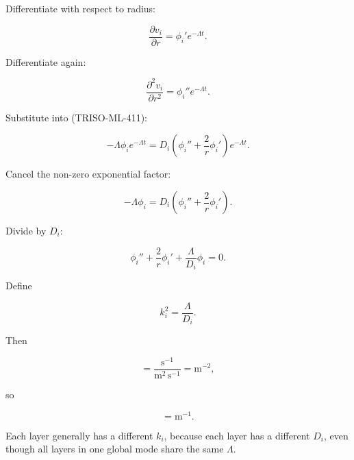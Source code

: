 \documentclass[11pt,a4paper]{article}
\begin{document}
Differentiate with respect to radius:

\begin{equation}
\frac{\partial v_i}{\partial r}
=
\phi_i'e^{-\Lambda t}.
\tag{TRISO-ML-422}
\label{eq:triso-ml-422}
\end{equation}

Differentiate again:

\begin{equation}
\frac{\partial^2v_i}{\partial r^2}
=
\phi_i''e^{-\Lambda t}.
\tag{TRISO-ML-423}
\label{eq:triso-ml-423}
\end{equation}

Substitute into (TRISO-ML-411):

\begin{equation}
-\Lambda\phi_i e^{-\Lambda t}
=
D_i
\left(
\phi_i''
+\frac2r\phi_i'
\right)
e^{-\Lambda t}.
\tag{TRISO-ML-424}
\label{eq:triso-ml-424}
\end{equation}

Cancel the non-zero exponential factor:

\begin{equation}
-\Lambda\phi_i
=
D_i
\left(
\phi_i''
+\frac2r\phi_i'
\right).
\tag{TRISO-ML-425}
\label{eq:triso-ml-425}
\end{equation}

Divide by $D_i$:

\begin{equation}
\phi_i''
+\frac2r\phi_i'
+
\frac{\Lambda}{D_i}\phi_i
=
0.
\tag{TRISO-ML-426}
\label{eq:triso-ml-426}
\end{equation}

Define

\begin{equation}
\boxed{
k_i^2=\frac{\Lambda}{D_i}.
}
\tag{TRISO-ML-427}
\label{eq:triso-ml-427}
\end{equation}

Then

\begin{equation}
[k_i^2]
=
\frac{\mathrm{s^{-1}}}{\mathrm{m^2\,s^{-1}}}
=
\mathrm{m^{-2}},
\tag{TRISO-ML-428}
\label{eq:triso-ml-428}
\end{equation}

so

\begin{equation}
[k_i]=\mathrm{m^{-1}}.
\tag{TRISO-ML-429}
\label{eq:triso-ml-429}
\end{equation}

Each layer generally has a different $k_i$, because each layer has a different $D_i$, even though all layers in one global mode share the same $\Lambda$.
\end{document}
